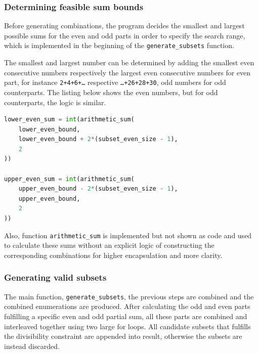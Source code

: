\documentclass[11pt,a4paper]{article}
\begin{document}
\subsubsection*{Determining feasible sum bounds}

Before generating combinations, the program decides the smallest and largest possible sums for the even and odd parts in order to specify the search range, which is implemented in the beginning of the \texttt{generate\_subsets} function.

The smallest and largest number can be determined by adding the smallest even consecutive numbers respectively the largest even consecutive numbers for even part, for instance \texttt{2+4+6+\ldots} respective \texttt{\ldots+26+28+30}, odd numbers for odd counterparts. The listing below shows the even numbers, but for odd counterparts, the logic is similar.

\begin{lstlisting}[language=python]
lower_even_sum = int(arithmetic_sum(
    lower_even_bound,
    lower_even_bound + 2*(subset_even_size - 1),
    2
))

upper_even_sum = int(arithmetic_sum(
    upper_even_bound - 2*(subset_even_size - 1),
    upper_even_bound,
    2
))
\end{lstlisting}

Also, function \texttt{arithmetic\_sum} is implemented but not shown as code and used to calculate these sums without an explicit logic of constructing the corresponding combinations for higher encapsulation and more clarity.

\subsubsection*{Generating valid subsets}

The main function, \texttt{generate\_subsets}, the previous steps are combined and the combined enumerations are produced.
After calculating the odd and even parts fulfilling a specific even and odd partial sum, all these parts are combined and interleaved together using two large for loops. All candidate subsets that fulfills the divisibility constraint are appended into result, otherwise the subsets are instead discarded.
\end{document}
